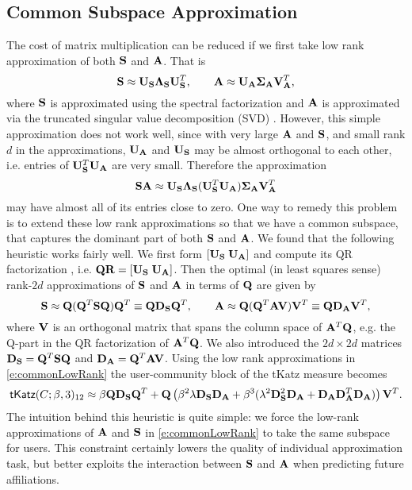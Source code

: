 \subsection{Common Subspace Approximation}
\label{Common Subspace Approximation}
The cost of matrix multiplication can be reduced if we first take low rank approximation of both $\mathbf{S}$ and $\mathbf{A}$. That is
\begin{equation}
\label{e:sepLowRank}
 \mathbf{S} \approx \mathbf{U}_{\mathbf{S}} \mathbf{\Lambda}_{\mathbf{S}} \mathbf{U}_{\mathbf{S}}^T, \qquad \mathbf{A} \approx \mathbf{U}_{\mathbf{A}} \mathbf{\Sigma}_{\mathbf{A}} \mathbf{V}_{\mathbf{A}}^T,
\end{equation}
where $\mathbf{S}$ is approximated using the spectral factorization and $\mathbf{A}$ is approximated via the truncated singular value decomposition (SVD) \cite{golub96}. However, this simple approximation does not work well, since with very large $\mathbf{A}$ and $\mathbf{S}$, and small rank $d$ in the approximations, $\mathbf{U}_{\mathbf{A}}$ and $\mathbf{U}_{\mathbf{S}}$ may be almost orthogonal to each other, i.e. entries of $\mathbf{U}_{\mathbf{S}}^T \mathbf{U}_{\mathbf{A}}$ are very small.
Therefore the approximation
\[
\mathbf{S} \mathbf{A} \approx \mathbf{U}_{\mathbf{S}} \mathbf{\Lambda}_{\mathbf{S}} (\mathbf{U}_{\mathbf{S}}^T\mathbf{U}_{\mathbf{A}}) \mathbf{\Sigma}_{\mathbf{A}} \mathbf{V}_{\mathbf{A}}^T
\]
may have almost all of its entries close to zero. One way to remedy this problem is to extend these low rank approximations so that we have a common subspace, that captures the dominant part of both $\mathbf{S}$ and $\mathbf{A}$. We found that the following heuristic works fairly well.
We first form $[ \mathbf{U}_{\mathbf{S}} \; \mathbf{U}_{\mathbf{A}}]$ and compute its QR factorization \cite{golub96}, i.e. $\mathbf{Q} \mathbf{R}=[ \mathbf{U}_{\mathbf{S}} \; \mathbf{U}_{\mathbf{A}}]$. Then the optimal (in least squares sense) rank-$2d$ approximations of $\mathbf{S}$ and $\mathbf{A}$ in terms of $\mathbf{Q}$ are given by
\begin{equation}
\label{e:commonLowRank}
 \mathbf{S} \approx \mathbf{Q} (\mathbf{Q}^T \mathbf{S} \mathbf{Q}) \mathbf{Q}^T \equiv\mathbf{Q} \mathbf{D}_{\mathbf{S}} \mathbf{Q}^T,  \qquad \mathbf{A} \approx \mathbf{Q} (\mathbf{Q}^T \mathbf{A}\mathbf{V}) \mathbf{V}^T \equiv\mathbf{Q} \mathbf{D}_{\mathbf{A}} \mathbf{V}^T,
\end{equation}
where $\mathbf{V}$ is an orthogonal matrix that spans the column space of $\mathbf{A}^T \mathbf{Q}$, e.g. the Q-part in the QR factorization of $\mathbf{A}^T \mathbf{Q}$. We also introduced the $2d \times 2d$ matrices $\mathbf{D}_{\mathbf{S}} = \mathbf{Q}^T \mathbf{S} \mathbf{Q}$ and $\mathbf{D}_{\mathbf{A}} = \mathbf{Q}^T \mathbf{A}\mathbf{V}$.
Using the low rank approximations in \eqref{e:commonLowRank} the user-community block of the \textsf{tKatz} measure becomes
\begin{equation}
\label{e:tKatzCS}
  \textsf{tKatz}(C;\beta,3)_{12} \approx \beta \mathbf{Q}\mathbf{D}_{\mathbf{S}}\mathbf{Q}^T  + \mathbf{Q} \left( \beta^2 \lambda \mathbf{D}_{\mathbf{S}} \mathbf{D}_{\mathbf{A}} +  \beta^3(\lambda^2 \mathbf{D}_{\mathbf{S}}^2 \mathbf{D}_{\mathbf{A}}  + \mathbf{D}_{\mathbf{A}} \mathbf{D}_{\mathbf{A}}^T \mathbf{D}_{\mathbf{A}}) \right) \mathbf{V}^T.
\end{equation}
The intuition behind this heuristic is quite simple: we force the low-rank approximations of $\mathbf{A}$ and $\mathbf{S}$ in \eqref{e:commonLowRank} to take the same subspace for users. This constraint certainly lowers the quality of individual approximation task, but better exploits the interaction between $\mathbf{S}$ and $\mathbf{A}$  when predicting future affiliations.

